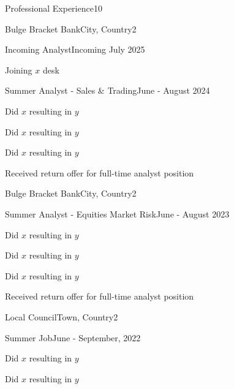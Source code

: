 \documentclass[10pt,a4paper]{CV}
\begin{document}
\begin{Section}{Professional Experience}{10}
    \begin{Institution}{Bulge Bracket Bank}{City, Country}{2}
        \begin{Position}{Incoming Analyst}{Incoming July 2025}
            \item Joining $x$ desk
            \vspace{-4pt}
        \end{Position}
        \begin{Position}{Summer Analyst - Sales \& Trading}{June - August 2024}
            \item Did $x$ resulting in $y$
            \item Did $x$ resulting in $y$
            \item Did $x$ resulting in $y$
            \item Received return offer for full-time analyst position
        \end{Position}
    \end{Institution}
    
    \begin{Institution}{Bulge Bracket Bank}{City, Country}{2}
        \begin{Position}{Summer Analyst - Equities Market Risk}{June - August 2023}
            \item Did $x$ resulting in $y$
            \item Did $x$ resulting in $y$
            \item Did $x$ resulting in $y$
            \item Received return offer for full-time analyst position
        \end{Position}
    \end{Institution}
    
    \begin{Institution}{Local Council}{Town, Country}{2}
        \begin{Position}{Summer Job}{June - September, 2022}
            \item Did $x$ resulting in $y$
            \item Did $x$ resulting in $y$
        \end{Position}
    \end{Institution}
\end{Section}
\end{document}
